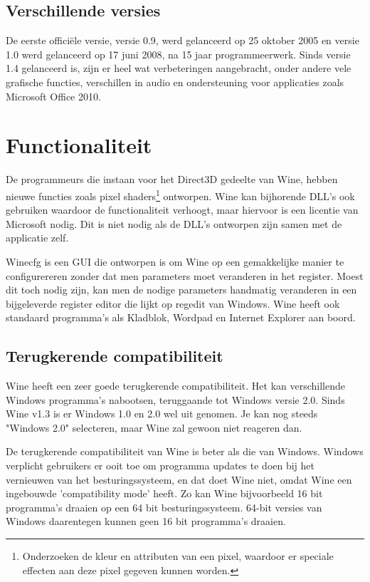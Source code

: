 \documentclass[12pt]{article}
\begin{document}
\subsection{Verschillende versies}
De eerste officiële versie, versie 0.9, werd gelanceerd op 25 oktober 2005 en versie 1.0 werd gelanceerd op 17 juni 2008, na 15 jaar programmeerwerk. 
Sinds versie 1.4 gelanceerd is, zijn er heel wat verbeteringen aangebracht, onder andere vele grafische functies, verschillen in audio en ondersteuning voor applicaties zoals Microsoft Office 2010.
\newpage
\section{Functionaliteit}
De programmeurs die instaan voor het Direct3D gedeelte van Wine, hebben nieuwe functies zoals pixel shaders\footnote{Onderzoeken de kleur en attributen van een pixel, waardoor er speciale effecten aan deze pixel gegeven kunnen worden.} ontworpen. Wine kan bijhorende DLL's ook gebruiken waardoor de functionaliteit verhoogt, maar hiervoor is een licentie van Microsoft nodig. Dit is niet nodig als de DLL's ontworpen zijn samen met de applicatie zelf.

Winecfg is een GUI die ontworpen is om Wine op een gemakkelijke manier te configurereren zonder dat men parameters moet veranderen in het register. Moest dit toch nodig zijn, kan men de nodige parameters handmatig veranderen in een bijgeleverde register editor die lijkt op regedit van Windows. Wine heeft ook standaard programma's als Kladblok, Wordpad en Internet Explorer aan boord.

\subsection{Terugkerende compatibiliteit}
Wine heeft een zeer goede terugkerende compatibiliteit. Het kan verschillende Windows programma's nabootsen, teruggaande tot Windows versie 2.0. Sinds Wine v1.3 is er Windows 1.0 en 2.0 wel uit genomen. Je kan nog steeds "Windows 2.0" selecteren, maar Wine zal gewoon niet reageren dan.

De terugkerende compatibiliteit van Wine is beter als die van Windows. Windows verplicht gebruikers er ooit toe om programma updates te doen bij het vernieuwen van het besturingssysteem, en dat doet Wine niet, omdat Wine een ingebouwde 'compatibility mode' heeft. Zo kan Wine bijvoorbeeld 16 bit programma's draaien op een 64 bit besturingssysteem. 64-bit versies van Windows daarentegen kunnen geen 16 bit programma's draaien.
\end{document}
